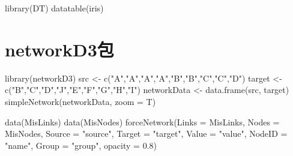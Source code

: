 \documentclass[
]{book}
\newenvironment{Shaded}{\begin{snugshade}}{\end{snugshade}}
\newcommand{\AttributeTok}[1]{\textcolor[rgb]{0.77,0.63,0.00}{#1}}
\newcommand{\FloatTok}[1]{\textcolor[rgb]{0.00,0.00,0.81}{#1}}
\newcommand{\FunctionTok}[1]{\textcolor[rgb]{0.00,0.00,0.00}{#1}}
\newcommand{\NormalTok}[1]{#1}
\newcommand{\OtherTok}[1]{\textcolor[rgb]{0.56,0.35,0.01}{#1}}
\newcommand{\StringTok}[1]{\textcolor[rgb]{0.31,0.60,0.02}{#1}}
\begin{document}
\begin{Shaded}
\begin{Highlighting}[]
\FunctionTok{library}\NormalTok{(DT)}
\FunctionTok{datatable}\NormalTok{(iris)}
\end{Highlighting}
\end{Shaded}

\hypertarget{networkd3ux5305}{%
\section{networkD3包}\label{networkd3ux5305}}

\begin{Shaded}
\begin{Highlighting}[]
\FunctionTok{library}\NormalTok{(networkD3)}
\NormalTok{src }\OtherTok{\textless{}{-}} \FunctionTok{c}\NormalTok{(}\StringTok{"A"}\NormalTok{,}\StringTok{"A"}\NormalTok{,}\StringTok{"A"}\NormalTok{,}\StringTok{"A"}\NormalTok{,}\StringTok{"B"}\NormalTok{,}\StringTok{"B"}\NormalTok{,}\StringTok{"C"}\NormalTok{,}\StringTok{"C"}\NormalTok{,}\StringTok{"D"}\NormalTok{)}
\NormalTok{target }\OtherTok{\textless{}{-}} \FunctionTok{c}\NormalTok{(}\StringTok{"B"}\NormalTok{,}\StringTok{"C"}\NormalTok{,}\StringTok{"D"}\NormalTok{,}\StringTok{"J"}\NormalTok{,}\StringTok{"E"}\NormalTok{,}\StringTok{"F"}\NormalTok{,}\StringTok{"G"}\NormalTok{,}\StringTok{"H"}\NormalTok{,}\StringTok{"I"}\NormalTok{)}
\NormalTok{networkData }\OtherTok{\textless{}{-}} \FunctionTok{data.frame}\NormalTok{(src, target)}
\FunctionTok{simpleNetwork}\NormalTok{(networkData, }\AttributeTok{zoom =}\NormalTok{ T)}
\end{Highlighting}
\end{Shaded}

\begin{Shaded}
\begin{Highlighting}[]
\FunctionTok{data}\NormalTok{(MisLinks)}
\FunctionTok{data}\NormalTok{(MisNodes)}
\FunctionTok{forceNetwork}\NormalTok{(}\AttributeTok{Links =}\NormalTok{ MisLinks, }\AttributeTok{Nodes =}\NormalTok{ MisNodes, }\AttributeTok{Source =} \StringTok{"source"}\NormalTok{,}
             \AttributeTok{Target =} \StringTok{"target"}\NormalTok{, }\AttributeTok{Value =} \StringTok{"value"}\NormalTok{, }\AttributeTok{NodeID =} \StringTok{"name"}\NormalTok{,}
             \AttributeTok{Group =} \StringTok{"group"}\NormalTok{, }\AttributeTok{opacity =} \FloatTok{0.8}\NormalTok{)}
\end{Highlighting}
\end{Shaded}
\end{document}
